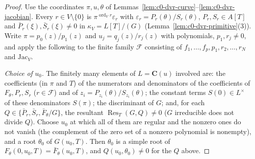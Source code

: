 \begin{proof}
Use the coordinates $\pi,u,\theta$ of Lemmas~\ref{lem:c0-dvr-curve}--\ref{lem:c0-dvr-jacobian}. Every $r\in V\setminus\{0\}$ is
$\pi^{\operatorname{ord}_V r}\varepsilon_r$ with $\varepsilon_r=P_r(\theta)/S_r(\theta)$, $P_r,S_r\in A[T]$ and $\bar P_r(\xi),\bar S_r(\xi)\ne0$ in $\kappa_V=L[T]/(G)$
(Lemma~\ref{lem:c0-dvr-primitive}(3)). Write $\pi=p_0(z)/p_1(z)$ and $u_j=q_j(z)/r_j(z)$ with polynomials, $p_1,r_j\ne0$, and
apply the following to the finite family $\mathcal F$ consisting of $f_1,\dots,f_p,p_1,r_2,\dots,r_N$ and $\mathrm{Jac}_V$.

\emph{Choice of $u_0$.} The finitely many elements of $L=\mathbf C(u)$ involved are: the coefficients (in $\pi$ and $T$) of the
numerators and denominators of the coefficients of $F_\theta,P_r,S_r$ ($r\in\mathcal F$) and of $z_i=P_{z_i}(\theta)/S_{z_i}(\theta)$; the
constant terms $S(0)\in L^\times$ of these denominators $S(\pi)$; the discriminant of $G$; and, for each $Q\in\{\bar P_r,\bar S_r,
\bar F_\theta/G\}$, the resultant $\operatorname{Res}_T(G,Q)\ne0$ ($G$ irreducible does not divide $Q$). Choose $u_0$ at which all of them are
regular and the nonzero ones do not vanish (the complement of the zero set of a nonzero polynomial is nonempty), and a root
$\theta_0$ of $G(u_0,T)$. Then $\theta_0$ is a simple root of $F_\theta(0,u_0,T)=\bar F_\theta(u_0,T)$, and $Q(u_0,\theta_0)\ne0$ for the $Q$
above.


\end{proof}
